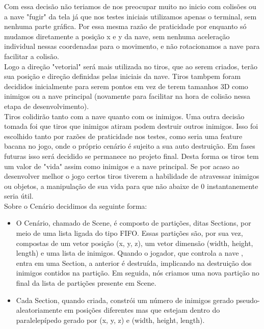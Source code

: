 \documentclass[12pt,a4paper]{article}
\begin{document}
	  	Com essa decisão não teriamos de nos preocupar muito no inicio com colisões ou a nave "fugir"
		da tela já que nos testes iniciais utilizamos apenas o terminal, sem nenhuma parte gráfica. Por
		essa mesma razão de praticidade por enquanto só mudamos diretamente a posição x e y da nave,
		sem nenhuma aceleração individual nessas coordenadas para o movimento, e não rotacionamos a nave
		para facilitar a colisão.\\
		
	  	Logo a direção "vetorial" será mais utilizada no tiros, que ao serem criados, terão sua
		posição e direção definidas pelas iniciais da nave. Tiros tambpem foram decididos inicialmente
		para serem pontos em vez de terem tamanhos 3D como inimigos ou a nave principal (novamente para
		facilitar na hora de colisão nessa etapa de desenvolvimento).\\
		
    		Tiros colidirão tanto com a nave quanto com os inimigos. Uma outra decisão tomada foi que
		tiros que inimigos atiram podem destruir outros inimigos. Isso foi escolhido tanto por razões de
		praticidade nos testes, como seria uma feature bacana no jogo, onde o próprio cenário é sujeito
		a sua auto destruição. Em fases futuras isso será decidido se permanece no projeto final.
    		Desta forma os tiros tem um valor de "vida" assim como inimigos e a nave principal. Se por
		acaso ao desenvolver melhor o jogo certos tiros tiverem a habilidade de atravessar inimigos ou
		objetos, a manipulação de sua vida para que não abaixe de 0 instantanemente seria útil.\\
		
    		Sobre o Cenário decidimos da seguinte forma:
    		\begin{itemize}
    			\item O Cenário, chamado de Scene, é composto de partições, ditas Sections, por meio de uma lista
			ligada do tipo FIFO. Essas partições são, por sua vez, compostas de um vetor posição (x, y, z),
			um vetor dimensão (width, height, length) e uma lista de inimigos. Quando o jogador, que controla
			a nave , entra em uma Section, a anterior é destruída, implicando na destruição dos inimigos
			contidos na partição. Em seguida, nós criamos uma nova partição no final da lista de
			partições presente em Scene.
		
    			\item Cada Section, quando criada, constrói um número de inimigos gerado pseudo-aleatoriamente em
			posições diferentes mas que estejam dentro do paralelepípedo gerado por (x, y, z) e
			(width, height, length).	
    		\end{itemize}
    		
\end{document}

